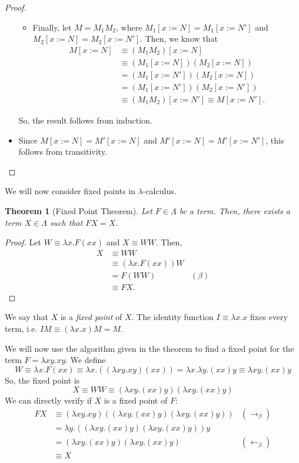 \documentclass[a4paper, openany]{memoir}
\newtheorem{theorem}[proposition]{Theorem}
\theoremstyle{definition}
\begin{document}
\begin{proof}
\begin{itemize}
\begin{itemize}
                \item Finally, let $M = M_1 M_2$, where $M_1[x := N] = M_1[x := N']$ and $M_2[x := N] = M_2[x := N']$. Then, we know that
                \begin{align*}
                    M[x := N] &\equiv (M_1 M_2)[x := N] \\
                    &\equiv (M_1[x := N]) (M_2[x := N]) \\
                    &= (M_1[x := N']) (M_2[x := N]) \\
                    &= (M_1[x := N']) (M_2[x := N']) \\
                    &\equiv (M_1 M_2)[x := N'] \equiv M[x := N'].
                \end{align*}
            \end{itemize}
            So, the result follows from induction.
            
            \item Since $M[x := N] = M'[x := N]$ and $M'[x := N] = M'[x := N']$, this follows from transitivity.
        \end{itemize}
    \end{proof}

    We will now consider fixed points in $\lambda$-calculus.
    \begin{theorem}[Fixed Point Theorem]
        Let $F \in \Lambda$ be a term. Then, there exists a term $X \in \Lambda$ such that $FX = X$.
    \end{theorem}
    \begin{proof}
        Let $W \equiv \lambda x.F(xx)$ and $X \equiv WW$. Then,
        \begin{align*}
            X &\equiv WW \\
            &\equiv (\lambda x.F(xx)) W \\
            &= F(WW) & (\beta) \\
            &\equiv FX.
        \end{align*}
    \end{proof}
    \noindent We say that $X$ is a \emph{fixed point} of $X$. The identity function $I \equiv \lambda x.x$ fixes every term, i.e. $IM \equiv (\lambda x.x)M = M$. 
    
    We will now use the algorithm given in the theorem to find a fixed point for the term $F = \lambda xy.xy$. We define
    \[W \equiv \lambda x.F(xx) \equiv \lambda x.((\lambda xy.xy)(xx)) = \lambda x.\lambda y.(xx)y \equiv \lambda xy.(xx)y\]
    So, the fixed point is
    \[X \equiv WW \equiv (\lambda xy.(xx)y)(\lambda xy.(xx)y)\]
    We can directly verify if $X$ is a fixed point of $F$:
    \begin{align*}
        FX &\equiv (\lambda xy.xy)((\lambda xy.(xx)y)(\lambda xy.(xx)y)) & (\to_\beta) \\
        &= \lambda y.((\lambda xy.(xx)y)(\lambda xy.(xx)y))y \\
        &= (\lambda xy.(xx)y)(\lambda xy.(xx)y) & (\leftarrow_\beta) \\
        &\equiv X
    \end{align*}
    
\end{document}
